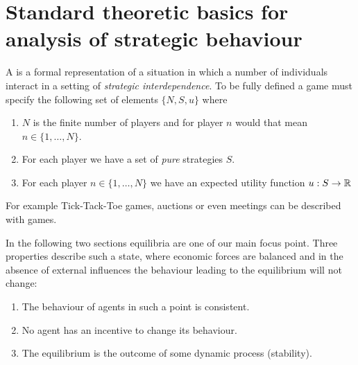 

\chapter{Standard theoretic basics for analysis of strategic behaviour}

A  is a formal representation of a situation in which a number of individuals interact in a setting of \textit{strategic interdependence}.
To be fully defined a game must specify the following set of elements $\{ N, S, u \}$ where
	\begin{enumerate}
		\item $N$ is the finite number of players and for player $n$ would that mean $n \in \{ 1, \dotsc, N \}$.
		\item For each player we have a set of \textit{pure} strategies $S$.
		\item For each player $n \in \{1, \dotsc, N \}$ we have an expected utility function $u : S \rightarrow \mathbb{R}$
	\end{enumerate}

For example Tick-Tack-Toe games, auctions or even meetings can be described with games. 

In the following two sections equilibria are one of our main focus point. Three properties describe such a state, where economic forces are balanced and in the absence of external influences the behaviour leading to the equilibrium will not change:
\begin{enumerate}
	\item The behaviour of agents in such a point is consistent.
	\item No agent has an incentive to change its behaviour.
	\item The equilibrium is the outcome of some dynamic process (stability).
\end{enumerate}